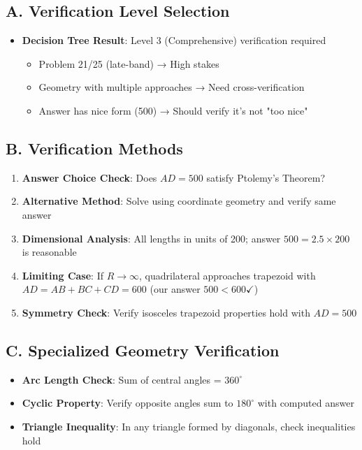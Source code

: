 \documentclass[12pt]{article}
\begin{document}
\begin{verificationbox}
\subsection*{A. Verification Level Selection}
\begin{itemize}[leftmargin=*]
    \item \textbf{Decision Tree Result}: Level 3 (Comprehensive) verification required
    \begin{itemize}
        \item Problem 21/25 (late-band) → High stakes
        \item Geometry with multiple approaches → Need cross-verification
        \item Answer has nice form (500) → Should verify it's not "too nice"
    \end{itemize}
\end{itemize}

\subsection*{B. Verification Methods}
\begin{enumerate}[leftmargin=*]
    \item \textbf{Answer Choice Check}: Does $AD = 500$ satisfy Ptolemy's Theorem?
    \item \textbf{Alternative Method}: Solve using coordinate geometry and verify same answer
    \item \textbf{Dimensional Analysis}: All lengths in units of 200; answer $500 = 2.5 \times 200$ is reasonable
    \item \textbf{Limiting Case}: If $R \to \infty$, quadrilateral approaches trapezoid with $AD = AB + BC + CD = 600$ (our answer $500 < 600 \checkmark$)
    \item \textbf{Symmetry Check}: Verify isosceles trapezoid properties hold with $AD = 500$
\end{enumerate}

\subsection*{C. Specialized Geometry Verification}
\begin{itemize}[leftmargin=*]
    \item \textbf{Arc Length Check}: Sum of central angles = $360^\circ$
    \item \textbf{Cyclic Property}: Verify opposite angles sum to $180^\circ$ with computed answer
    \item \textbf{Triangle Inequality}: In any triangle formed by diagonals, check inequalities hold
\end{itemize}


\end{verificationbox}
\end{document}
